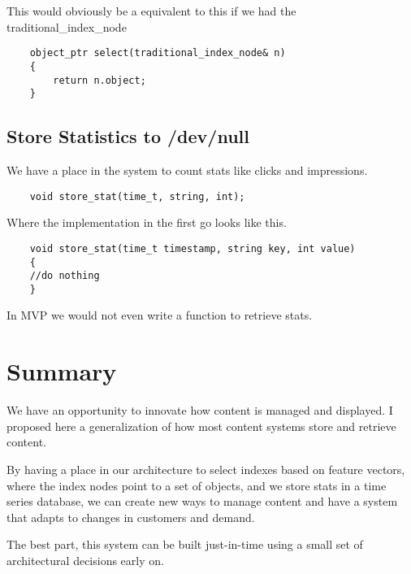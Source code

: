 \documentclass[11pt]{article}
\begin{document}
This would obviously be a equivalent to this if we had the traditional\_index\_node

\begin{lstlisting}
    object_ptr select(traditional_index_node& n) 
    {
        return n.object;
    }
\end{lstlisting}

\subsection{Store Statistics to /dev/null}

We have a place in the system to count stats like clicks and impressions.

\begin{lstlisting}
    void store_stat(time_t, string, int);
\end{lstlisting}

Where the implementation in the first go looks like this.

\begin{lstlisting}
    void store_stat(time_t timestamp, string key, int value) 
    {
    //do nothing 
    }
\end{lstlisting}

In MVP we would not even write a function to retrieve stats.

\section{Summary}

We have an opportunity to innovate how content is managed and displayed. 
I proposed here a generalization of how most content systems store
and retrieve content.

By having a place in our architecture to select indexes based on feature vectors,
where the index nodes point to a set of objects, and we store stats in a time series
database, we can create new ways to manage content and have a system that adapts
to changes in customers and demand.

The best part, this system can be built just-in-time using a small set of 
architectural decisions early on.
\end{document}
